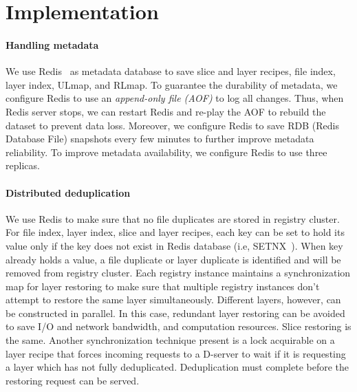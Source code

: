\section{Implementation}
\label{sec:impl}

\paragraph{Handling metadata}
We use Redis~\cite{redis} as metadata database to save slice and layer recipes, file index, layer index, ULmap, and RLmap.
To guarantee the durability of metadata, 
we configure Redis to use an \emph{append-only file (AOF)} to log all changes.
Thus, when Redis server stops, we can restart Redis and re-play the AOF to rebuild the dataset to prevent data loss.
Moreover, we configure Redis to save RDB (Redis Database File) snapshots every few minutes to further improve metadata reliability. 
To improve metadata availability, 
we configure Redis to use three replicas.

\paragraph{Distributed deduplication}
We use Redis to make sure that no file duplicates are stored in registry cluster.
For file index, layer index, slice and layer recipes, each key can be set to hold its value only if the key does not exist in Redis database (i.e, SETNX~\cite{SETNX}).
When key already holds a value, a file duplicate or layer duplicate is identified and will be removed from registry cluster. Each registry instance maintains a synchronization map for layer restoring to make sure that multiple registry instances don't attempt to restore the same layer simultaneously.
 Different layers, however, can be constructed in parallel. 
 In this case, redundant layer restoring can be avoided to save I/O and network bandwidth, and computation resources.
 Slice restoring is the same. Another synchronization technique present is a lock acquirable on a layer recipe that forces incoming requests to a D-server to wait if it is requesting a layer which has not fully deduplicated. Deduplication must complete before the restoring request can be served.
 

